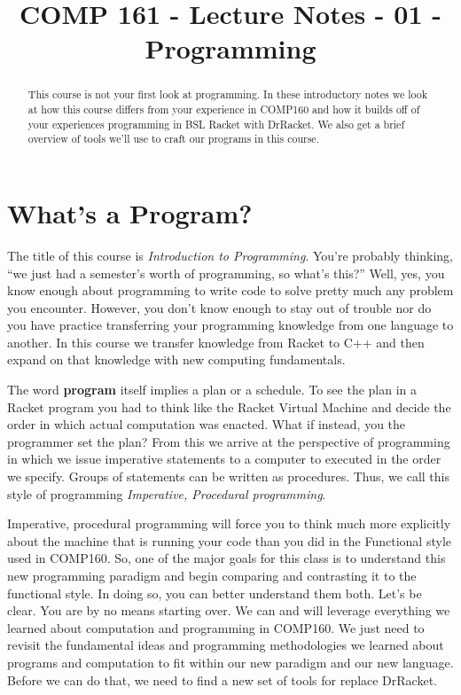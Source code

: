 \documentclass[]{tufte-handout}
\title{COMP 161 - Lecture Notes - 01 - Programming}
\begin{document}
\maketitle

\begin{abstract}
This course is not your first look at programming. In these introductory notes we look at how this course differs from your experience in COMP160 and how it builds off of your experiences programming in BSL Racket with DrRacket.  We also get a brief overview of tools we'll use to craft our programs in this course. 
\end{abstract}

\section{What's a Program?}

The title of this course is \textit{Introduction to Programming}.  You're probably thinking, ``we just had a semester's worth of programming, so what's this?''  Well, yes, you know enough about programming to write code to solve pretty much any problem you encounter. However, you don't know enough to stay out of trouble nor do you have practice transferring your programming knowledge from one language to another. In this course we transfer knowledge from Racket to C++ and then expand on that knowledge with new computing fundamentals. 

The word \textbf{program} itself implies a plan or a schedule. To see the plan in a Racket program you had to think like the Racket Virtual Machine and decide the order in which actual computation was enacted. What if instead, you the programmer set the plan? From this we arrive at the perspective of programming in which we issue imperative statements to a computer to executed in the order we specify. Groups of statements can be written as procedures. Thus, we call this style of programming \textit{Imperative, Procedural programming}. 

Imperative, procedural programming will force you to think much more explicitly about the machine that is running your code than you did in the Functional style used in COMP160. So, one of the major goals for this class is to understand this new programming paradigm and begin comparing and contrasting it to the functional style. In doing so, you can better understand them both. Let's be clear. You are by no means starting over.  We can and will leverage everything we learned about computation and programming in COMP160. We just need to revisit the fundamental ideas and programming methodologies we learned about programs and computation to fit within our new paradigm and our new language. Before we can do that, we need to find a new set of tools for replace DrRacket.
\end{document}
